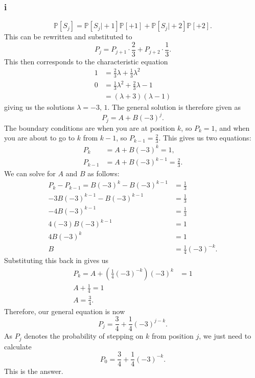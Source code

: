\documentclass{article}
\newcommand{\Prob}{\mathbb{P}}
\begin{document}
\subsubsection{i}
\begin{equation}
    \Prob[S_j] = \Prob[S_j\vert+1]\Prob[+1] + \Prob[S_j\vert+2]\Prob[+2].
\end{equation}
This can be rewritten and substituted to
\begin{equation}
    P_j = P_{j+1}\cdot\frac{2}{3} + P_{j+2}\cdot\frac{1}{3}.
\end{equation}
This then corresponds to the characteristic equation
\begin{align}
    1 &= \frac{2}{3}\lambda + \frac{1}{3}\lambda^2 \\
    0 &= \frac{1}{3}\lambda^2 + \frac{2}{3}\lambda - 1 \\
    &=(\lambda+3)(\lambda-1)
\end{align}
giving us the solutions $\lambda=-3,\,1$. The general solution is therefore given as
\begin{equation}
    P_j = A + B(-3)^j.
\end{equation}
The boundary conditions are when you are at position $k$, so $P_k=1$, and when you are about to go to $k$ from $k-1$, so $P_{k-1} = \frac{2}{3}$. This gives us two equations:
\begin{align}
    P_k &= A+B(-3)^k = 1,\\
    P_{k-1} &= A+B(-3)^{k-1} = \frac{2}{3}.
\end{align}
We can solve for $A$ and $B$ as follows:
\begin{align}
    P_k-P_{k-1} = B(-3)^k-B(-3)^{k-1} &= \frac{1}{3} \\
    -3B(-3)^{k-1} - B(-3)^{k-1} &= \frac{1}{3} \\
    -4B(-3)^{k-1} &= \frac{1}{3} \\
    4(-3)B(-3)^{k-1} &= 1 \\
    4B(-3)^k &= 1 \\
    B &= \frac{1}{4}(-3)^{-k}.
\end{align}
Substituting this back in gives us
\begin{align}
    P_k = A + \left(\frac{1}{4}(-3)^{-k}\right)(-3)^k &= 1 \\
    A + \frac{1}{4} = 1 \\
    A = \frac{3}{4}.
\end{align}
Therefore, our general equation is now
\begin{equation}
    P_j = \frac{3}{4} + \frac{1}{4}(-3)^{j-k}.
\end{equation}
As $P_j$ denotes the probability of stepping on $k$ from position $j$, we just need to calculate
\begin{equation}
    P_0 = \frac{3}{4}+\frac{1}{4}(-3)^{-k}.
\end{equation}
This is the answer.
\end{document}
